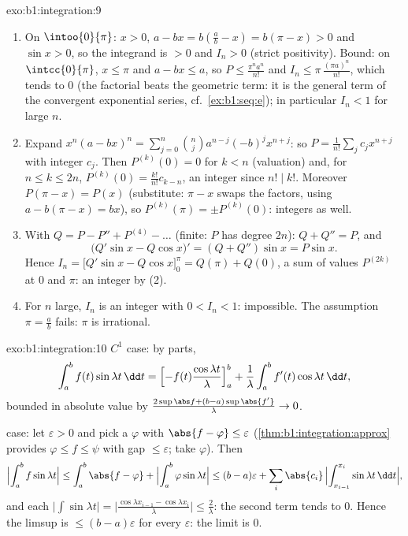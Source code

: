\begin{solution}{exo:b1:integration:9}
\begin{enumerate}
  \item On $\intoo{0}{\pi}$: $x > 0$, $a - bx = b(\frac ab - x) =
        b(\pi - x) > 0$ and $\sin x > 0$, so the integrand is $> 0$
        and $I_n > 0$ (strict positivity). Bound: on
        $\intcc{0}{\pi}$, $x \leq \pi$ and $a - bx \leq a$, so $P
        \leq \frac{\pi^n a^n}{n!}$ and $I_n \leq
        \pi\,\frac{(\pi a)^n}{n!}$, which tends to $0$ (the
        factorial beats the geometric term: it is the general term
        of the convergent exponential series, cf.\
        \cref{ex:b1:seq:e}); in particular $I_n < 1$ for large $n$.
  \item Expand $x^n(a - bx)^n = \sum_{j=0}^{n} \binom nj a^{n-j}
        (-b)^j x^{n+j}$: so $P = \frac{1}{n!}\sum_j c_j x^{n+j}$
        with integer $c_j$. Then $P^{(k)}(0) = 0$ for $k < n$
        (valuation) and, for $n \leq k \leq 2n$, $P^{(k)}(0) =
        \frac{k!}{n!} c_{k-n}$, an integer since $n! \mid k!$.
        Moreover $P(\pi - x) = P(x)$ (substitute: $\pi - x$ swaps
        the factors, using $a - b(\pi - x) = bx$), so $P^{(k)}(\pi)
        = \pm P^{(k)}(0)$: integers as well.
  \item With $Q = P - P'' + P^{(4)} - \dots$ (finite: $P$ has degree
        $2n$): $Q + Q'' = P$, and
        \[
        \bigl(Q'\sin x - Q\cos x\bigr)' = (Q + Q'')\sin x = P\sin x .
        \]
        Hence $I_n = \bigl[Q'\sin x - Q\cos x\bigr]_0^{\pi} = Q(\pi)
        + Q(0)$, a sum of values $P^{(2k)}$ at $0$ and $\pi$: an
        integer by (2).
  \item For $n$ large, $I_n$ is an integer with $0 < I_n < 1$:
        impossible. The assumption $\pi = \frac ab$ fails: $\pi$ is
        irrational.
\end{enumerate}
\end{solution}

\begin{solution}{exo:b1:integration:10}
$C^1$ case: by parts,
\[
\int_a^b f(t)\sin\lambda t\,\dd t
= \Bigl[-f(t)\frac{\cos\lambda t}{\lambda}\Bigr]_a^b
+ \frac{1}{\lambda}\int_a^b f'(t)\cos\lambda t\,\dd t,
\]
bounded in absolute value by $\frac{2\sup\abs f + (b - a)\sup\abs{f'}}
{\lambda} \to 0$.

 case: let $\varepsilon > 0$ and pick a 
$\varphi$ with $\abs{f - \varphi} \leq \varepsilon$
(\cref{thm:b1:integration:approx} provides $\varphi \leq f \leq
\psi$ with gap $\leq\varepsilon$; take $\varphi$). Then
\[
\Bigl|\int_a^b f\sin\lambda t\Bigr|
\leq \int_a^b \abs{f - \varphi}
+ \Bigl|\int_a^b \varphi \sin\lambda t\Bigr|
\leq (b-a)\varepsilon
+ \sum_i \abs{c_i}\,\Bigl|\int_{x_{i-1}}^{x_i} \sin\lambda t\,\dd
t\Bigr| ,
\]
and each $\bigl|\int \sin \lambda t\bigr| = \bigl|\frac{\cos\lambda
x_{i-1} - \cos\lambda x_i}{\lambda}\bigr| \leq \frac{2}{\lambda}$:
the second term tends to $0$. Hence the limsup is $\leq
(b-a)\varepsilon$ for every $\varepsilon$: the limit is $0$.
\end{solution}

